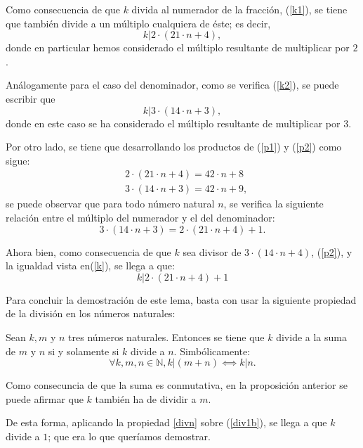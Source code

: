 \begin{demostracion}
  Como consecuencia de que \(k\) divida al numerador de la fracción,
  (\ref{k1}), se tiene que también divide a un múltiplo cualquiera de
  éste; es decir,
  \begin{equation}\label{p1}
    k | 2⋅(21⋅n+4),
  \end{equation}
  donde en particular hemos considerado el múltiplo resultante de
  multiplicar por \(2\).

  Análogamente para el caso del denominador, como se verifica
  (\ref{k2}), se puede escribir que
  \begin{equation}\label{p2}
    k | 3⋅(14⋅n+3),
  \end{equation}
  donde en este caso se ha considerado el múltiplo resultante de
  multiplicar por \(3\).

  Por otro lado, se tiene que desarrollando los productos de (\ref{p1}) y
  (\ref{p2}) como sigue:
  \begin{align}
    & 2⋅(21⋅n+4)=42⋅n+8    \\
    & 3·(14·n+3)=42·n+9,
  \end{align}
  se puede observar que para todo número natural \(n\), se verifica la
  siguiente relación entre el múltiplo del numerador y el del denominador:
  \begin{equation}\label{k}
    3⋅(14⋅n+3)=2⋅(21⋅n+4)+1.
  \end{equation}

  Ahora bien, como consecuencia de que \(k\) sea divisor de
  \(3⋅(14⋅n+4)\), (\ref{p2}), y la igualdad vista en(\ref{k}), se llega
  a que:
  \begin{equation}\label{div1b}
    k | 2⋅(21⋅n+4)+1
  \end{equation}

  Para concluir la demostración de este lema, basta con usar la siguiente
  propiedad de la división en los números naturales:

  \begin{proposicion}\label{divn}
    Sean \(k,m\) y \(n\) tres números naturales. Entonces se tiene que
    \(k\) divide a la suma de \(m\) y \(n\) si y solamente si \(k\)
    divide a \(n\). Simbólicamente:
    \begin{equation}
      ∀k,m,n ∈ ℕ, k | (m+n) ⟺ k|n.
    \end{equation}
  \end{proposicion}


  \begin{nota}
    Como consecuncia de que la suma es conmutativa, en la proposición
    anterior se puede afirmar que \(k\) también ha de dividir a \(m\).
  \end{nota}

  De esta forma, aplicando la propiedad \ref{divn} sobre (\ref{div1b}),
  se llega a que \(k\) divide a \(1\); que era lo que queríamos
  demostrar.
\end{demostracion}

